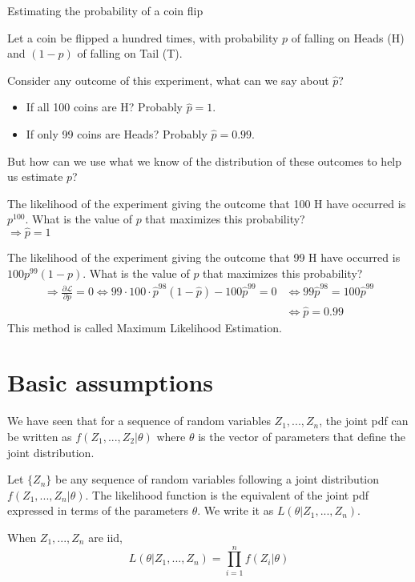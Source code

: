 \begin{bclogo}[couleur=blue!10, arrondi=0.1, logo=,ombre=false]{ Estimating the probability of a coin flip} 
\begin{small}
Let a coin be flipped a hundred times, with probability $p$ of falling on Heads (H) and $(1-p)$ of falling on Tail (T).

Consider any outcome of this experiment, what can we say about $\hat p$?\begin{itemize}
\item If all 100 coins are H? Probably $\hat p = 1$.
\item If only 99 coins are Heads? Probably $\hat p = 0.99$.
\end{itemize} But how can we use what we know of the distribution of these outcomes to help us estimate $p$?

The likelihood of the experiment giving the outcome that 100 H have occurred is $p^{100}$. What is the value of $p$ that maximizes this probability?\\ $\Rightarrow \hat p = 1$

The likelihood of the experiment giving the outcome that 99 H have occurred is $100p^{99}(1-p)$. What is the value of $p$ that maximizes this probability?\begin{align*}
\Rightarrow \frac{\partial\mathcal{L}}{\partial p} = 0 \Leftrightarrow 99\cdot 100\cdot \hat p^{98} (1 - \hat p) - 100 \hat p^{99} = 0 & \Leftrightarrow 99\hat p^{98} = 100 \hat p^{99} \\ & \Leftrightarrow \hat p = 0.99
\end{align*} 
This method is called Maximum Likelihood Estimation.
\end{small}
\end{bclogo}

\section{Basic assumptions}

We have seen that for a sequence of random variables $Z_1, ..., Z_n$, the joint pdf can be written as $f(Z_1, ..., Z_2 \vert \theta)$ where $\theta$ is the vector of parameters that define the joint distribution.

\begin{definition}
Let $\{Z_n\}$ be any sequence of random variables following a joint distribution $f(Z_1, ..., Z_n\vert \theta)$. The likelihood function is the equivalent of the joint pdf expressed in terms of the parameters $\theta$. We write it as $L(\theta\vert Z_1, ..., Z_n)$.

When $Z_1,...,Z_n$ are iid, $$ L(\theta\vert Z_1, ..., Z_n) = \prod_{i=1}^{n} f(Z_i\vert \theta) $$
\end{definition}


